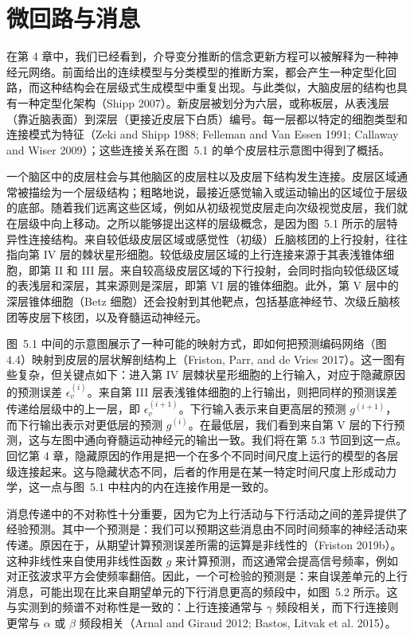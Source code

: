 \section{微回路与消息}

在第 4 章中，我们已经看到，介导变分推断的信念更新方程可以被解释为一种神经元网络。前面给出的连续模型与分类模型的推断方案，都会产生一种定型化回路，而这种结构会在层级式生成模型中重复出现。与此类似，大脑皮层的结构也具有一种定型化架构（Shipp 2007）。新皮层被划分为六层，或称板层，从表浅层（靠近脑表面）到深层（更接近皮层下白质）编号。每一层都以特定的细胞类型和连接模式为特征（Zeki and Shipp 1988; Felleman and Van Essen 1991; Callaway and Wiser 2009）；这些连接关系在图~5.1 的单个皮层柱示意图中得到了概括。

一个脑区中的皮层柱会与其他脑区的皮层柱以及皮层下结构发生连接。皮层区域通常被描绘为一个层级结构；粗略地说，最接近感觉输入或运动输出的区域位于层级的底部。随着我们远离这些区域，例如从初级视觉皮层走向次级视觉皮层，我们就在层级中向上移动。之所以能够提出这样的层级概念，是因为图~5.1 所示的层特异性连接结构。来自较低级皮层区域或感觉性（初级）丘脑核团的上行投射，往往指向第 IV 层的棘状星形细胞。较低级皮层区域的上行连接来源于其表浅锥体细胞，即第 II 和 III 层。来自较高级皮层区域的下行投射，会同时指向较低级区域的表浅层和深层，其来源则是深层，即第 VI 层的锥体细胞。此外，第 V 层中的深层锥体细胞（Betz 细胞）还会投射到其他靶点，包括基底神经节、次级丘脑核团等皮层下核团，以及脊髓运动神经元。

图~5.1 中间的示意图展示了一种可能的映射方式，即如何把预测编码网络（图 4.4）映射到皮层的层状解剖结构上（Friston, Parr, and de Vries 2017）。这一图有些复杂，但关键点如下：进入第 IV 层棘状星形细胞的上行输入，对应于隐藏原因的预测误差 $\epsilon_v^{(i)}$。来自第 III 层表浅锥体细胞的上行输出，则把同样的预测误差传递给层级中的上一层，即 $\epsilon_v^{(i+1)}$。下行输入表示来自更高层的预测 $g^{(i+1)}$，而下行输出表示对更低层的预测 $g^{(i)}$。在最低层，我们看到来自第 V 层的下行预测，这与左图中通向脊髓运动神经元的输出一致。我们将在第 5.3 节回到这一点。回忆第 4 章，隐藏原因的作用是把一个在多个不同时间尺度上运行的模型的各层级连接起来。这与隐藏状态不同，后者的作用是在某一特定时间尺度上形成动力学，这一点与图~5.1 中柱内的内在连接作用是一致的。

消息传递中的不对称性十分重要，因为它为上行活动与下行活动之间的差异提供了经验预测。其中一个预测是：我们可以预期这些消息由不同时间频率的神经活动来传递。原因在于，从期望计算预测误差所需的运算是非线性的（Friston 2019b）。这种非线性来自使用非线性函数 $g$ 来计算预测，而这通常会提高信号频率，例如对正弦波求平方会使频率翻倍。因此，一个可检验的预测是：来自误差单元的上行消息，可能出现在比来自期望单元的下行消息更高的频段中，如图~5.2 所示。这与实测到的频谱不对称性是一致的：上行连接通常与 $\gamma$ 频段相关，而下行连接则更常与 $\alpha$ 或 $\beta$ 频段相关（Arnal and Giraud 2012; Bastos, Litvak et al. 2015）。


